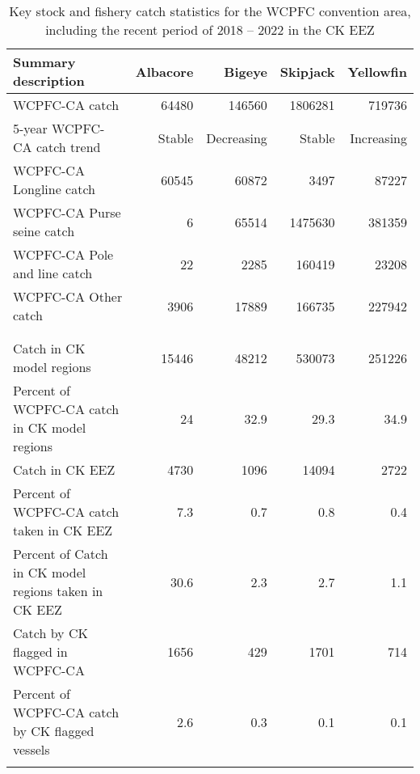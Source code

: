 \begin{longtable}{lrrrr}
\caption{Key stock and fishery catch statistics for the WCPFC convention area, including the recent period of 2018 -- 2022 in the CK EEZ} \\ 
  \hline
Summary description & Albacore & Bigeye & Skipjack & Yellowfin \\ 
  \hline
WCPFC-CA catch & 64480 & 146560 & 1806281 & 719736 \\ 
  5-year WCPFC-CA catch trend & Stable & Decreasing & Stable & Increasing \\ 
  WCPFC-CA Longline catch & 60545 & 60872 & 3497 & 87227 \\ 
  WCPFC-CA Purse seine catch & 6 & 65514 & 1475630 & 381359 \\ 
  WCPFC-CA Pole and line catch & 22 & 2285 & 160419 & 23208 \\ 
  WCPFC-CA Other catch & 3906 & 17889 & 166735 & 227942 \\ 
   &  &  &  &  \\ 
   &  &  &  &  \\ 
   \hline
Catch in CK model regions & 15446 & 48212 & 530073 & 251226 \\ 
  Percent of WCPFC-CA catch in CK model regions & 24 & 32.9 & 29.3 & 34.9 \\ 
  Catch in CK EEZ & 4730 & 1096 & 14094 & 2722 \\ 
  Percent of WCPFC-CA catch taken in CK EEZ & 7.3 & 0.7 & 0.8 & 0.4 \\ 
  Percent of Catch in CK model regions taken in CK EEZ & 30.6 & 2.3 & 2.7 & 1.1 \\ 
  Catch by CK flagged in WCPFC-CA & 1656 & 429 & 1701 & 714 \\ 
  Percent of WCPFC-CA catch by CK flagged vessels & 2.6 & 0.3 & 0.1 & 0.1 \\ 
  \hline
\label{cat_sum_tab}
\end{longtable}
